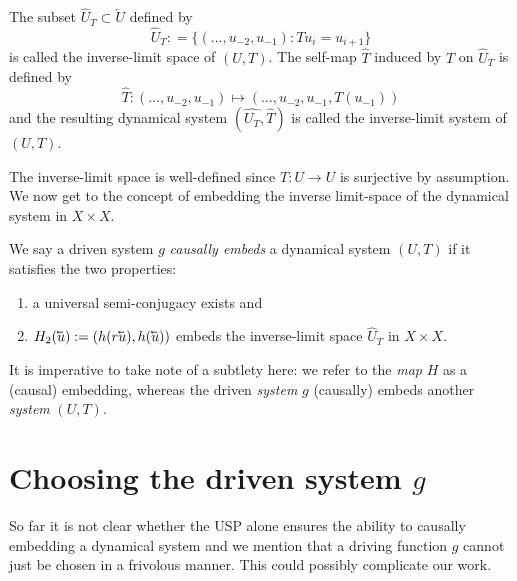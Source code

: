\begin{Definition}
  \label{Dfn_InverseL}\rm
 The subset $\widehat{U}_T\subset \overleftarrow{U}$ defined by 
 \begin{equation}
  \widehat{U}_T: = \{ (\ldots,u_{-2},u_{-1}): Tu_{i} = u_{i+1}\}  
 \end{equation}
 is called the inverse-limit space of $(U,T)$.
 The self-map $\widehat{T}$  induced by $T$ on $\widehat{U}_T$  is defined by 
 \begin{equation}
  \widehat{T}: (\ldots,u_{-2},u_{-1}) \mapsto  (\ldots,u_{-2},u_{-1},T(u_{-1}))  
 \end{equation}
 and the resulting dynamical system $(\widehat{U_T}, \widehat{T})$ is called the inverse-limit system of $(U,T)$.
\end{Definition}

The inverse-limit space is well-defined since $T : U \to{U}$ is surjective by assumption.
We now get to the concept of embedding the inverse limit-space of the dynamical system in $X \times X$. 
\begin{Definition} \rm
	We say a driven system $g$ \emph{causally embeds} a dynamical system $(U,T)$ if it satisfies the two properties: 
  \vspace{-8mm}
\begin{enumerate}[noitemsep, label=\roman*.]
  \item  a universal semi-conjugacy exists and  
  \item  $H_2(\cev{u}) := (h(r\cev{u}),h(\cev{u}))$ embeds the inverse-limit space $\widehat{U}_T$ in $X \times X$. 
\end{enumerate}
\end{Definition} 
 
It is imperative to take note of a subtlety here: we refer to the \emph{map} $H$ as a (causal) embedding, whereas the driven \emph{system} $g$ (causally) embeds another \emph{system} $(U,T)$. 

\section{Choosing the driven system $g$}

So far it is not clear whether the USP alone ensures the ability to causally embedding a dynamical system and we mention that a driving function $g$ cannot just be chosen in a frivolous manner. This could possibly complicate our work. %

